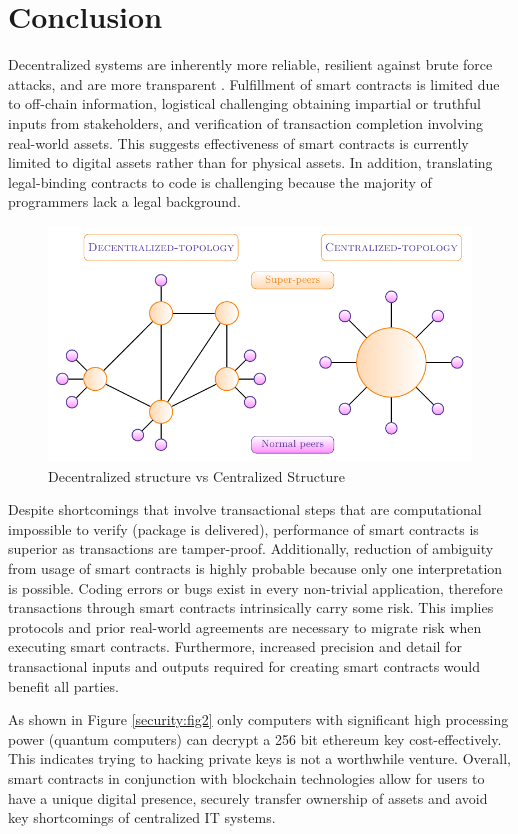 \section{Conclusion}

Decentralized systems are inherently more reliable, resilient against brute force attacks, and are more transparent \cite{bitcoinWhitePaper:Online,ethereumWhitePaper:Online}. Fulfillment of smart contracts is limited due to off-chain information, logistical challenging obtaining impartial or truthful inputs from stakeholders, and verification of transaction completion involving real-world assets. This suggests effectiveness of smart contracts is currently limited to digital assets rather than for physical assets.  In addition, translating legal-binding contracts to code is challenging because the majority of programmers lack a legal background.

\begin{figure}[H]
\centering
\includegraphics[width=0.7\linewidth]{Diagrams/DappVApp}
\caption{Decentralized structure vs Centralized Structure}
\label{fig:dappvapp}
\end{figure}

Despite shortcomings that involve transactional steps that are computational impossible to verify (package is delivered), performance of smart contracts is superior as transactions are tamper-proof.
Additionally, reduction of ambiguity from usage of smart contracts is highly probable because only one interpretation is possible. Coding errors or bugs exist in every non-trivial application, therefore transactions through smart contracts intrinsically carry some risk. This implies protocols and prior real-world agreements are necessary to migrate risk when executing smart contracts. Furthermore, increased precision and detail for transactional inputs and outputs required for creating smart contracts would benefit all parties. 

As shown in Figure \ref{security:fig2} only computers with significant high processing power  (quantum computers) can decrypt a 256 bit ethereum key cost-effectively. This indicates trying to hacking private keys is not a worthwhile venture.
Overall, smart contracts in conjunction with blockchain technologies allow for users to have a unique digital presence, securely transfer ownership of assets and avoid key shortcomings of centralized IT systems.

